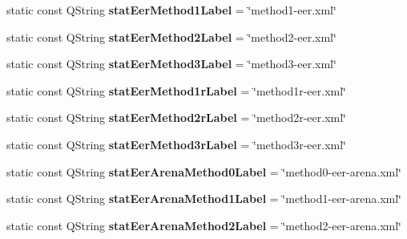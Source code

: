 \begin{DoxyCompactItemize}
\item 
\hypertarget{class_common_a42bb0f031e99ee5506be9c2bda92f6dd}{static const Q\+String {\bfseries stat\+Eer\+Method1\+Label} = \char`\"{}method1-\/eer.\+xml\char`\"{}}\label{class_common_a42bb0f031e99ee5506be9c2bda92f6dd}

\item 
\hypertarget{class_common_a5ae048b62e9d43cff84325deb7bc5324}{static const Q\+String {\bfseries stat\+Eer\+Method2\+Label} = \char`\"{}method2-\/eer.\+xml\char`\"{}}\label{class_common_a5ae048b62e9d43cff84325deb7bc5324}

\item 
\hypertarget{class_common_a17de4b1c52e03f706c100f14dfe3a7a4}{static const Q\+String {\bfseries stat\+Eer\+Method3\+Label} = \char`\"{}method3-\/eer.\+xml\char`\"{}}\label{class_common_a17de4b1c52e03f706c100f14dfe3a7a4}

\item 
\hypertarget{class_common_a3eac3c5de7408e5da2ddb85a5930a778}{static const Q\+String {\bfseries stat\+Eer\+Method1r\+Label} = \char`\"{}method1r-\/eer.\+xml\char`\"{}}\label{class_common_a3eac3c5de7408e5da2ddb85a5930a778}

\item 
\hypertarget{class_common_ac32371227113bdb3830da279236f5e0b}{static const Q\+String {\bfseries stat\+Eer\+Method2r\+Label} = \char`\"{}method2r-\/eer.\+xml\char`\"{}}\label{class_common_ac32371227113bdb3830da279236f5e0b}

\item 
\hypertarget{class_common_a8abc2bf6d72a1dc7bc0825d5b806fab2}{static const Q\+String {\bfseries stat\+Eer\+Method3r\+Label} = \char`\"{}method3r-\/eer.\+xml\char`\"{}}\label{class_common_a8abc2bf6d72a1dc7bc0825d5b806fab2}

\item 
\hypertarget{class_common_a92b37d221f86a5cf87ce319c6e0b7901}{static const Q\+String {\bfseries stat\+Eer\+Arena\+Method0\+Label} = \char`\"{}method0-\/eer-\/arena.\+xml\char`\"{}}\label{class_common_a92b37d221f86a5cf87ce319c6e0b7901}

\item 
\hypertarget{class_common_a1ad41f255a1dab8e3bd3c6fc6c41c0ee}{static const Q\+String {\bfseries stat\+Eer\+Arena\+Method1\+Label} = \char`\"{}method1-\/eer-\/arena.\+xml\char`\"{}}\label{class_common_a1ad41f255a1dab8e3bd3c6fc6c41c0ee}

\item 
\hypertarget{class_common_ab0d9cd643e49a01a0b8e80bc40bdc04a}{static const Q\+String {\bfseries stat\+Eer\+Arena\+Method2\+Label} = \char`\"{}method2-\/eer-\/arena.\+xml\char`\"{}}\label{class_common_ab0d9cd643e49a01a0b8e80bc40bdc04a}


\end{DoxyCompactItemize}
